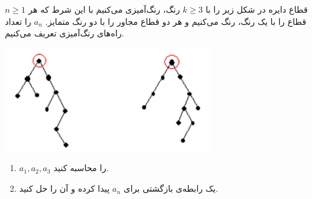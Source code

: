 \EXERCISE
$n \geq 1$
قطاع دایره در شکل زیر را با
$k \geq 3$
رنگ، رنگ‌آمیزی می‌کنیم با این شرط که هر قطاع را با یک رنگ، رنگ می‌کنیم و هر دو قطاع مجاور را با دو رنگ متمایز.
$a_n$
را تعداد راه‌های رنگ‌آمیزی تعریف می‌کنیم.
\begin{center}
\includegraphics[height=4.5cm]{19.png}
\end{center}
\begin{enumerate}
\item
$a_1, a_2, a_3$
را محاسبه کنید.
\item
یک رابطه‌ی بازگشتی برای
$a_n$
پیدا کرده و آن را حل کنید.
\end{enumerate}